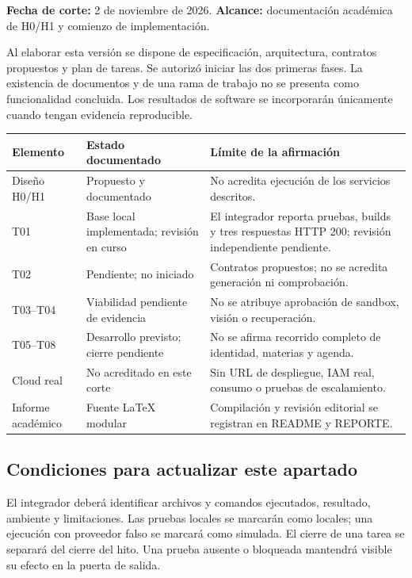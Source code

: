 \textbf{Fecha de corte:} 2 de noviembre de 2026. \textbf{Alcance:} documentación académica de H0/H1 y comienzo de implementación.

Al elaborar esta versión se dispone de especificación, arquitectura, contratos propuestos y plan de tareas. Se autorizó iniciar las dos primeras fases. La existencia de documentos y de una rama de trabajo no se presenta como funcionalidad concluida. Los resultados de software se incorporarán únicamente cuando tengan evidencia reproducible.

\begin{tabularx}{\linewidth}{P{2.6cm}P{3.4cm}Y}
\toprule
\textbf{Elemento} & \textbf{Estado documentado} & \textbf{Límite de la afirmación}\\
\midrule
Diseño H0/H1 & Propuesto y documentado & No acredita ejecución de los servicios descritos.\\
T01 & Base local implementada; revisión en curso & El integrador reporta pruebas, builds y tres respuestas HTTP 200; revisión independiente pendiente.\\
T02 & Pendiente; no iniciado & Contratos propuestos; no se acredita generación ni comprobación.\\
T03--T04 & Viabilidad pendiente de evidencia & No se atribuye aprobación de sandbox, visión o recuperación.\\
T05--T08 & Desarrollo previsto; cierre pendiente & No se afirma recorrido completo de identidad, materias y agenda.\\
Cloud real & No acreditado en este corte & Sin URL de despliegue, IAM real, consumo o pruebas de escalamiento.\\
Informe académico & Fuente LaTeX modular & Compilación y revisión editorial se registran en README y REPORTE.\\
\bottomrule
\end{tabularx}

\subsection*{Condiciones para actualizar este apartado}
El integrador deberá identificar archivos y comandos ejecutados, resultado, ambiente y limitaciones. Las pruebas locales se marcarán como locales; una ejecución con proveedor falso se marcará como simulada. El cierre de una tarea se separará del cierre del hito. Una prueba ausente o bloqueada mantendrá visible su efecto en la puerta de salida.

